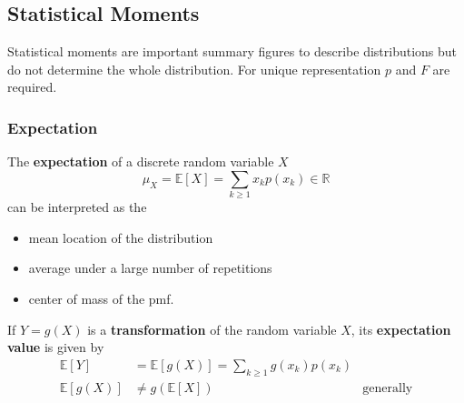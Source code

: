 \subsection{Statistical Moments}
Statistical moments are important summary figures to describe distributions but do not determine the whole distribution. For unique representation $p$ and $F$ are required.
\subsubsection{Expectation}
The \textbf{expectation} of a discrete random variable $X$
\noindent\begin{equation*}
    \mu_{X}=\mathbb{E}[X]=\sum_{k\geq1}x_{k}p(x_{k})\in\mathbb{R}
\end{equation*}
can be interpreted as the
\begin{itemize}
    \item mean location of the distribution
    \item average under a large number of repetitions
    \item center of mass of the pmf.
\end{itemize}

\newpar{}
If $Y=g(X)$ is a \textbf{transformation} of the random variable $X$, its \textbf{expectation value} is given by
\noindent\begin{align*}
    \mathbb{E}[Y]    & =\mathbb{E}[g(X)]=\sum_{k\geq1}g(x_{k})p(x_{k})                    \\
    \mathbb{E}[g(X)] & \neq g(\mathbb{E}[X])                           & \text{generally}
\end{align*}

